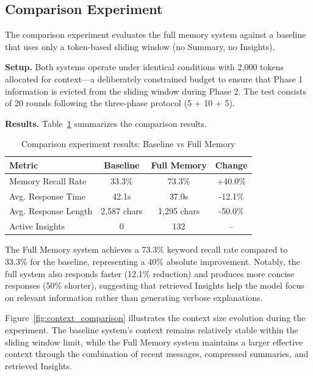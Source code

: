 \documentclass{article} %
\begin{document}
\subsection{Comparison Experiment}
\label{sec:comparison}

The comparison experiment evaluates the full memory system against a baseline that uses only a token-based sliding window (no Summary, no Insights).

\textbf{Setup.} Both systems operate under identical conditions with 2,000 tokens allocated for context---a deliberately constrained budget to ensure that Phase 1 information is evicted from the sliding window during Phase 2. The test consists of 20 rounds following the three-phase protocol (5 + 10 + 5).

\textbf{Results.} Table~\ref{tab:comparison_results} summarizes the comparison results.

\begin{table}[H]
\caption{Comparison experiment results: Baseline vs Full Memory}
\label{tab:comparison_results}
\begin{center}
\begin{tabular}{lccc}
\toprule
\textbf{Metric} & \textbf{Baseline} & \textbf{Full Memory} & \textbf{Change} \\
\midrule
Memory Recall Rate & 33.3\% & 73.3\% & +40.0\% \\
Avg. Response Time & 42.1s & 37.0s & -12.1\% \\
Avg. Response Length & 2,587 chars & 1,295 chars & -50.0\% \\
Active Insights & 0 & 132 & -- \\
\bottomrule
\end{tabular}
\end{center}
\end{table}

The Full Memory system achieves a 73.3\% keyword recall rate compared to 33.3\% for the baseline, representing a 40\% absolute improvement. Notably, the full system also responds faster (12.1\% reduction) and produces more concise responses (50\% shorter), suggesting that retrieved Insights help the model focus on relevant information rather than generating verbose explanations.

Figure~\ref{fig:context_comparison} illustrates the context size evolution during the experiment. The baseline system's context remains relatively stable within the sliding window limit, while the Full Memory system maintains a larger effective context through the combination of recent messages, compressed summaries, and retrieved Insights.
\end{document}
